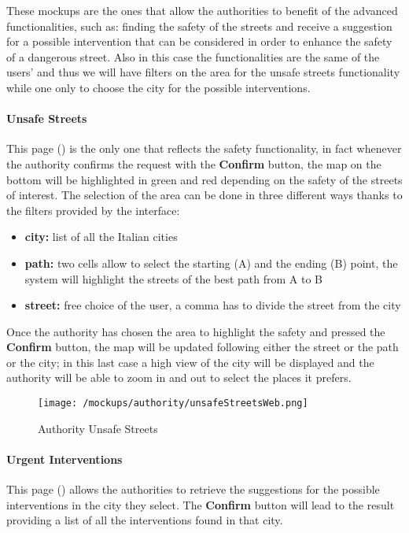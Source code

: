 				These mockups are the ones that allow the authorities to benefit of the advanced functionalities, such as: finding the safety of the streets and receive a suggestion for a possible intervention that can be considered in order to enhance the safety of a dangerous street. Also in this case the functionalities are the same of the users' and thus we will have filters on the area for the unsafe streets functionality while one only to choose the city for the possible interventions.
				
				\paragraph{Unsafe Streets}
				This page () is the only one that reflects the safety functionality, in fact whenever the authority confirms the request with the \textbf{Confirm} button, the map on the bottom will be highlighted in green and red depending on the safety of the streets of interest. The selection of the area can be done in three different ways thanks to the filters provided by the interface:
				
				\begin{itemize}
					\item \textbf{city:} list of all the Italian cities
					\item \textbf{path:} two cells allow to select the starting (A) and the ending (B) point, the system will highlight the streets of the best path from A to B
					\item \textbf{street:} free choice of the user, a comma has to divide the street from the city
				\end{itemize}
				
				Once the authority has chosen the area to highlight the safety and pressed the \textbf{Confirm} button, the map will be updated following either the street or the path or the city; in this last case a high view of the city will be displayed and the authority will be able to zoom in and out to select the places it prefers.
				
				\vspace{0.6cm}
					
				\begin{figure}[ht!]
					\centering
					\texttt{[image: /mockups/authority/unsafeStreetsWeb.png]}
					\caption{\label{fig:unsafeStreetsWeb} Authority Unsafe Streets}
				\end{figure}
			
				\paragraph{Urgent Interventions}
				This page () allows the authorities to retrieve the suggestions for the possible interventions in the city they select. The \textbf{Confirm} button will lead to the result providing a list of all the interventions found in that city.\\
				
